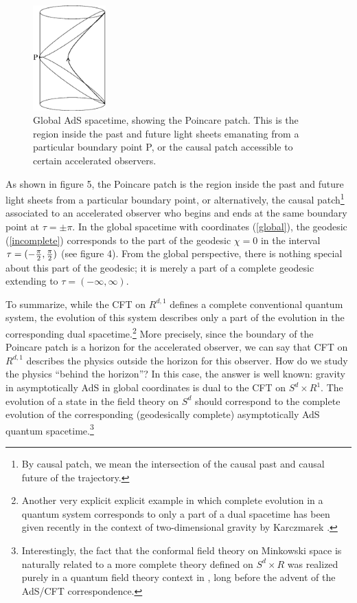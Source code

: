 \documentclass[12pt,epsf]{article}
\renewcommand{\(}{\left(}
\renewcommand{\)}{\right)}
\begin{document}
\begin{figure}
\centering
\includegraphics[width=0.25\textwidth]{global2.eps}
\caption{Global AdS spacetime, showing the Poincare patch. This is the region inside the past and future light sheets emanating from a particular boundary point P, or the causal patch accessible to certain accelerated observers.}
\end{figure}

As shown in figure 5, the Poincare patch is the region inside the past and future light sheets from a particular boundary point, or alternatively, the causal patch\footnote{By causal patch, we mean the intersection of the causal past and causal future of the trajectory.} associated to an accelerated observer who begins and ends at the same boundary point at $\tau = \pm \pi$. In the global spacetime with coordinates (\ref{global}), the geodesic (\ref{incomplete}) corresponds to the part of the geodesic $\chi=0$ in the interval $\tau = (-{\pi \over 2}, {\pi \over 2})$ (see figure 4). From the global perspective, there is nothing special about this part of the geodesic; it is merely a part of a complete geodesic extending to $\tau = (-\infty, \infty)$.

To summarize, while the CFT on $R^{d,1}$ defines a complete conventional quantum system, the evolution of this system describes only a part of the evolution in the corresponding dual spacetime.\footnote{Another very explicit explicit example in which complete evolution in a quantum system corresponds to only a part of a dual spacetime has been given recently in the context of two-dimensional gravity by Karczmarek \cite{karczmarek}.} More precisely, since the boundary of the Poincare patch is a horizon for the accelerated observer, we can say that CFT on $R^{d,1}$ describes the physics outside the horizon for this observer. How do we study the physics ``behind the horizon''? In this case, the answer is well known: gravity in asymptotically AdS in global coordinates is dual to the CFT on $S^d \times R^1$. The evolution of a state in the field theory on $S^d$ should correspond to the complete evolution of the corresponding (geodesically complete) asymptotically AdS quantum spacetime.\footnote{Interestingly, the fact that the conformal field theory on Minkowski space is naturally related to a more complete theory defined on $S^d \times R$ was realized purely in a quantum field theory context in \cite{lm}, long before the advent of the AdS/CFT correspondence.}
\end{document}
